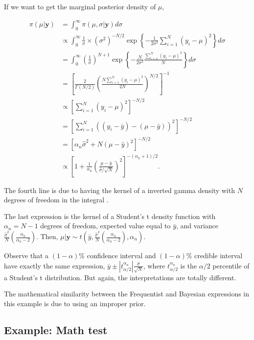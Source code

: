If we want to get the marginal posterior density of $\mu$, 

\begin{align*}
	\pi(\mu|\mathbf{y})&=\int_{0}^{\infty} \pi(\mu,\sigma|\mathbf{y}) d\sigma\\
	&\propto \int_{0}^{\infty} \frac{1}{\sigma}\times (\sigma^2)^{-N/2}\exp\left\{-\frac{1}{2\sigma^2}\sum_{i=1}^N (y_i-\mu)^2\right\} d\sigma\\ 
	&= \int_{0}^{\infty} \left(\frac{1}{\sigma}\right)^{N+1} \exp\left\{-\frac{N}{2\sigma^2}\frac{\sum_{i=1}^N (y_i-\mu)^2}{N}\right\} d\sigma\\
	&=\left[\frac{2}{\Gamma(N/2)}\left(\frac{N\sum_{i=1}^N (y_i-\mu)^2}{2N}\right)^{N/2}\right]^{-1}\\
	&\propto \left[\sum_{i=1}^N (y_i-\mu)^2\right]^{-N/2}\\
	&=\left[\sum_{i=1}^N ((y_i-\bar{y})-(\mu-\bar{y}))^2\right]^{-N/2}\\
	&=[\alpha_n\hat{\sigma}^2+N(\mu-\bar{y})^2]^{-N/2}\\
	&\propto \left[1+\frac{1}{\alpha_n}\left(\frac{\mu-\bar{y}}{\hat{\sigma}/\sqrt{N}}\right)^2\right]^{-(\alpha_n+1)/2}.
\end{align*}

The fourth line is due to having the kernel of a inverted gamma density with $N$ degrees of freedom in the integral \cite{zellner1996introduction}.

The last expression is the kernel of a Student's t density function with $\alpha_n=N-1$ degrees of freedom, expected value equal to $\bar{y}$, and variance $\frac{\hat{\sigma}^2}{N}\left(\frac{\alpha_n}{\alpha_n-2}\right)$. Then, $\mu|\mathbf{y}\sim t\left(\bar{y},\frac{\hat{\sigma}^2}{N}\left(\frac{\alpha_n}{\alpha_n-2}\right),\alpha_n\right)$.

Observe that a $(1-\alpha)\%$ confidence interval and $(1-\alpha)\%$ credible interval have exactly the same expression, $\bar{y}\pm |t_{\alpha/2}^{\alpha_n}|\frac{\hat{\sigma}}{\sqrt{N}}$, where $t_{\alpha/2}^{\alpha_n}$ is the $\alpha/2$ percentile of a Student's t distribution. But again, the interpretations are totally different.

The mathematical similarity between the Frequentist and Bayesian expressions in this example is due to using an improper prior.

\subsection{Example: Math test}\label{sec261}

